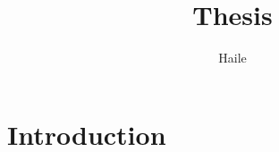\documentclass[9pt]{article}
\begin{document}
\title{Thesis}

\author{Haile}


\begin{abstract}
\end{abstract}

\maketitle
\section{Introduction}
\end{document}

